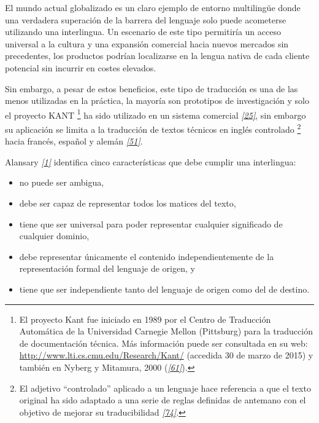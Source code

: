 \documentclass[a4paper,12pt,spanish]{book}
\begin{document}
El mundo actual globalizado es un claro ejemplo de entorno multilingüe donde una
verdadera superación de la barrera del lenguaje solo puede acometerse utilizando una
interlingua. Un escenario de este tipo permitiría un acceso universal a la cultura y
una expansión comercial hacia nuevos mercados sin precedentes, los productos podrían
localizarse en la lengua nativa de cada cliente potencial sin incurrir en costes elevados.

Sin embargo, a pesar de estos beneficios, este tipo de traducción es una de las menos
utilizadas en la práctica, la mayoría son prototipos de investigación y solo el
proyecto KANT \footnote{
El proyecto Kant fue iniciado en 1989 por el Centro de Traducción Automática de
la Universidad Carnegie Mellon (Pittsburg) para la traducción de documentación
técnica. Más información puede ser consultada en su web:
\href{http://www.lti.cs.cmu.edu/Research/Kant/}{http://www.lti.cs.cmu.edu/Research/Kant/} (accedida 30 de marzo de 2015) y
también en Nyberg y Mitamura, 2000 (\label{0.intro:id31}{\hyperref[zreferences:nyberg2000]{\emph{{[}61{]}}}}).
} ha sido utilizado en un sistema comercial \label{0.intro:id27}{\hyperref[zreferences:brown2006]{\emph{{[}25{]}}}}, sin
embargo su aplicación se limita a la traducción de textos técnicos en inglés
controlado \footnote{
El adjetivo ``controlado'' aplicado a un lenguaje hace referencia a que el texto
original ha sido adaptado a una serie de reglas definidas de antemano con el
objetivo de mejorar su traducibilidad \label{0.intro:id33}{\hyperref[zreferences:schwitter2010]{\emph{{[}74{]}}}}.
} hacia francés, español y alemán \label{0.intro:id29}{\hyperref[zreferences:lonsdale1994]{\emph{{[}51{]}}}}.

Alansary \label{0.intro:id34}{\hyperref[zreferences:alansary2011]{\emph{{[}1{]}}}} identifica cinco características que debe cumplir una
interlingua:
\begin{itemize}
\item {} 
no puede ser ambigua,

\item {} 
debe ser capaz de representar todos los matices del texto,

\item {} 
tiene que ser universal para poder representar cualquier significado de cualquier
dominio,

\item {} 
debe representar únicamente el contenido independientemente de la representación
formal del lenguaje de origen, y

\item {} 
tiene que ser independiente tanto del lenguaje de origen como del de destino.

\end{itemize}
\end{document}
